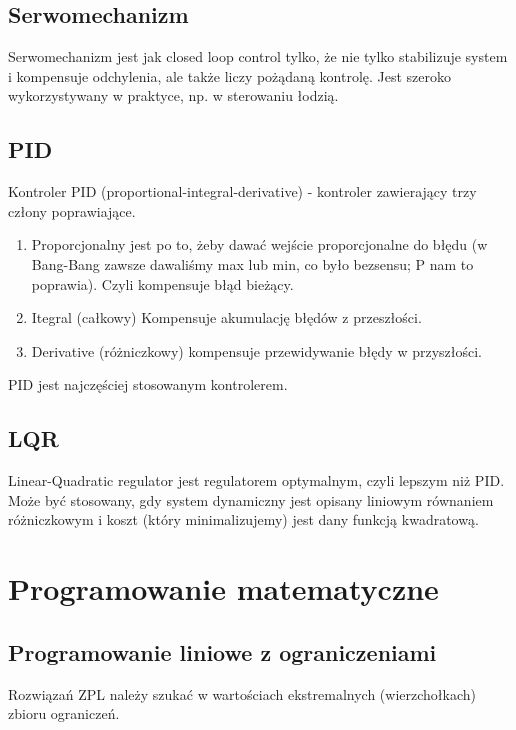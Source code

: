 \documentclass[12pt]{article}
\begin{document}
\subsection{Serwomechanizm}
Serwomechanizm jest jak closed loop control tylko, że nie tylko stabilizuje system i kompensuje odchylenia, ale także liczy pożądaną kontrolę. Jest szeroko wykorzystywany w praktyce, np. w sterowaniu łodzią.

\subsection{PID}
Kontroler PID (proportional-integral-derivative) - kontroler zawierający trzy człony poprawiające. 
\begin{enumerate}
	\item Proporcjonalny jest po to, żeby dawać wejście proporcjonalne do błędu (w Bang-Bang zawsze dawaliśmy max lub min, co było bezsensu; P nam to poprawia). Czyli kompensuje błąd bieżący.
	\item Itegral (całkowy) Kompensuje akumulację błędów z przeszłości.
	\item Derivative (różniczkowy) kompensuje przewidywanie błędy w przyszłości.
\end{enumerate}
PID jest najczęściej stosowanym kontrolerem.

\subsection{LQR}
Linear-Quadratic regulator jest regulatorem optymalnym, czyli lepszym niż PID. Może być stosowany, gdy system dynamiczny jest opisany liniowym równaniem różniczkowym i koszt (który minimalizujemy) jest dany funkcją kwadratową.

\section{Programowanie matematyczne}
\subsection{Programowanie liniowe z ograniczeniami}
Rozwiązań ZPL należy szukać w wartościach ekstremalnych (wierzchołkach) zbioru ograniczeń.\\
\end{document}
